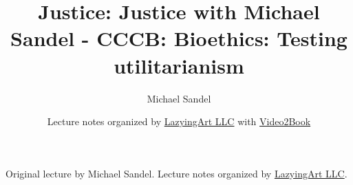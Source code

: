 \documentclass[11pt,oneside]{book}
\begin{document}
\frontmatter
\title{Justice: Justice with Michael Sandel - CCCB: Bioethics: Testing utilitarianism}
\author{Michael Sandel}
\date{Lecture notes organized by \href{https://lazying.art}{LazyingArt LLC} with \href{https://github.com/lachlanchen/Video2Book}{Video2Book}}
\maketitle
\begin{center}
\small Original lecture by Michael Sandel. Lecture notes organized by \href{https://lazying.art}{LazyingArt LLC}.
\end{center}
\clearpage
\mainmatter

\end{document}
